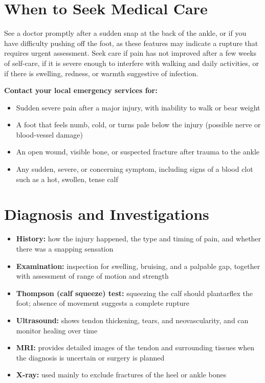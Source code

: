 \section*{When to Seek Medical Care}
See a doctor promptly after a sudden snap at the back of the ankle, or if you have difficulty pushing off the foot, as these features may indicate a rupture that requires urgent assessment. Seek care if pain has not improved after a few weeks of self-care, if it is severe enough to interfere with walking and daily activities, or if there is swelling, redness, or warmth suggestive of infection.

\textbf{Contact your local emergency services for:}
\begin{itemize}
    \item Sudden severe pain after a major injury, with inability to walk or bear weight
    \item A foot that feels numb, cold, or turns pale below the injury (possible nerve or blood-vessel damage)
    \item An open wound, visible bone, or suspected fracture after trauma to the ankle
    \item Any sudden, severe, or concerning symptom, including signs of a blood clot such as a hot, swollen, tense calf
\end{itemize}

\section*{Diagnosis and Investigations}
\begin{itemize}
    \item \textbf{History:} how the injury happened, the type and timing of pain, and whether there was a snapping sensation
    \item \textbf{Examination:} inspection for swelling, bruising, and a palpable gap, together with assessment of range of motion and strength
    \item \textbf{Thompson (calf squeeze) test:} squeezing the calf should plantarflex the foot; absence of movement suggests a complete rupture
    \item \textbf{Ultrasound:} shows tendon thickening, tears, and neovascularity, and can monitor healing over time
    \item \textbf{MRI:} provides detailed images of the tendon and surrounding tissues when the diagnosis is uncertain or surgery is planned
    \item \textbf{X-ray:} used mainly to exclude fractures of the heel or ankle bones
\end{itemize}

